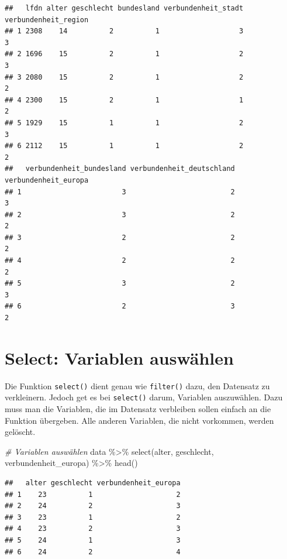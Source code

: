 \documentclass[
]{book}
\newenvironment{Shaded}{\begin{snugshade}}{\end{snugshade}}
\newcommand{\CommentTok}[1]{\textcolor[rgb]{0.56,0.35,0.01}{\textit{#1}}}
\newcommand{\FunctionTok}[1]{\textcolor[rgb]{0.00,0.00,0.00}{#1}}
\newcommand{\NormalTok}[1]{#1}
\newcommand{\SpecialCharTok}[1]{\textcolor[rgb]{0.00,0.00,0.00}{#1}}
\begin{document}
\begin{verbatim}
##   lfdn alter geschlecht bundesland verbundenheit_stadt verbundenheit_region
## 1 2308    14          2          1                   3                    3
## 2 1696    15          2          1                   2                    3
## 3 2080    15          2          1                   2                    2
## 4 2300    15          2          1                   1                    2
## 5 1929    15          1          1                   2                    3
## 6 2112    15          1          1                   2                    2
##   verbundenheit_bundesland verbundenheit_deutschland verbundenheit_europa
## 1                        3                         2                    3
## 2                        3                         2                    2
## 3                        2                         2                    2
## 4                        2                         2                    2
## 5                        3                         2                    3
## 6                        2                         3                    2
\end{verbatim}

\hypertarget{select-variablen-auswuxe4hlen}{%
\section{Select: Variablen auswählen}\label{select-variablen-auswuxe4hlen}}

Die Funktion \texttt{select()} dient genau wie \texttt{filter()} dazu, den Datensatz zu verkleinern. Jedoch get es bei \texttt{select()} darum, Variablen auszuwählen. Dazu muss man die Variablen, die im Datensatz verbleiben sollen einfach an die Funktion übergeben. Alle anderen Variablen, die nicht vorkommen, werden gelöscht.

\begin{Shaded}
\begin{Highlighting}[]
\CommentTok{\# Variablen auswählen}
\NormalTok{data }\SpecialCharTok{\%\textgreater{}\%} 
  \FunctionTok{select}\NormalTok{(alter, geschlecht, verbundenheit\_europa) }\SpecialCharTok{\%\textgreater{}\%} 
  \FunctionTok{head}\NormalTok{()}
\end{Highlighting}
\end{Shaded}

\begin{verbatim}
##   alter geschlecht verbundenheit_europa
## 1    23          1                    2
## 2    24          2                    3
## 3    23          1                    2
## 4    23          2                    3
## 5    24          1                    3
## 6    24          2                    4
\end{verbatim}
\end{document}
